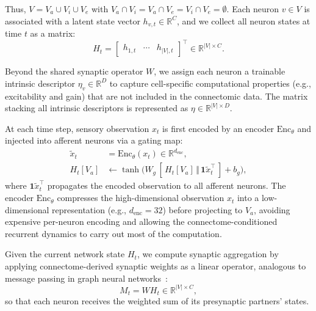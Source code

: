 \documentclass[a4paper]{easychair}
\begin{document}
Thus, $V = V_a \cup V_i \cup V_e$ with $V_a \cap V_i = V_a \cap V_e = V_i \cap V_e = \emptyset$. Each neuron $v \in V$ is associated with a latent state vector $h_{v,t} \in \mathbb{R}^{C}$, and we collect all neuron states at time $t$ as a matrix:
\begin{equation}
H_t = \begin{bmatrix} h_{1,t} & \cdots & h_{|V|,t} \end{bmatrix}^\top \in \mathbb{R}^{|V| \times C}.
\end{equation}

Beyond the shared synaptic operator $W$, we assign each neuron a trainable intrinsic descriptor $\eta_v \in \mathbb{R}^{D}$ to capture cell-specific computational properties (e.g., excitability and gain) that are not included in the connectomic data. The matrix stacking all intrinsic descriptors is represented as $\eta \in \mathbb{R}^{|V|\times D}$.

At each time step, sensory observation $x_t$ is first encoded by an encoder $\mathrm{Enc}_\theta$ and injected into afferent neurons via a gating map:
\begin{align}
\tilde{x}_t &= \mathrm{Enc}_\theta(x_t) \in \mathbb{R}^{d_{\text{enc}}},\\
H_t[V_a] &\leftarrow \tanh\!\big(W_g\,[\,H_t[V_a] \,\Vert\, \mathbf{1}\tilde{x}_t^\top\,] + b_g\big),
\end{align}
where $\mathbf{1}\tilde{x}_t^\top$ propagates the encoded observation to all afferent neurons. The encoder $\mathrm{Enc}_\theta$ compresses the high-dimensional observation $x_t$ into a low-dimensional representation (e.g., $d_{\text{enc}}=32$) before projecting to $V_a$, avoiding expensive per-neuron encoding and allowing the connectome-conditioned recurrent dynamics to carry out most of the computation.

Given the current network state $H_t$, we compute synaptic aggregation by applying connectome-derived synaptic weights as a linear operator, analogous to message passing in graph neural networks~\citep{Kipf2017a,Hamilton2018,Corso2020}:
\begin{equation}
M_t = W H_t \in \mathbb{R}^{|V|\times C},
\end{equation}
so that each neuron receives the weighted sum of its presynaptic partners' states.
\end{document}
